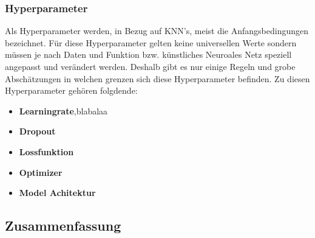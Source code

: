 \subsubsection{Hyperparameter}
Als Hyperparameter werden, in Bezug auf KNN's, meist die Anfangsbedingungen bezeichnet.
Für diese Hyperparameter gelten keine universellen Werte sondern müssen je nach Daten und Funktion bzw. künstliches Neuroales Netz speziell angepasst und verändert werden. Deshalb gibt es nur einige Regeln und grobe Abschätzungen in welchen grenzen sich diese Hyperparameter befinden. Zu diesen Hyperparameter gehören folgdende:
\begin{itemize}
\item \textbf{Learningrate},blabalaa
\item \textbf{Dropout}
\item \textbf{Lossfunktion}
\item \textbf{Optimizer}
\item \textbf{Model Achitektur}
\end{itemize}

\subsection{Zusammenfassung}

